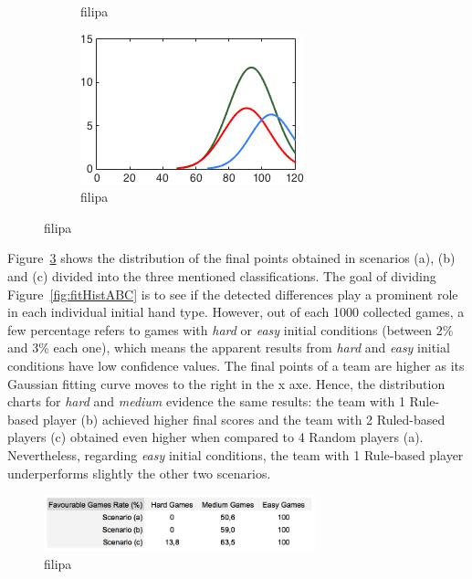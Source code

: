 \begin{figure}[h]
\begin{subfigure}[h]{0.32\textwidth}
                \caption{filipa}
                \label{fig:ABC-Hmedium}
        \end{subfigure}
        \begin{subfigure}[h]{0.32\textwidth}
                \includegraphics[width=\textwidth]{./img/4/ABCeasy}
                \caption{filipa}
                \label{fig:ABC-Heasy}
        \end{subfigure}
        \caption{filipa}
        \label{fig:ABC-CH}
\end{figure}

Figure~\ref{fig:ABC-CH} shows the distribution of the final points obtained in scenarios (a), (b) and (c) divided into the three mentioned classifications.
The goal of dividing Figure~\ref{fig:fitHistABC} is to see if the detected differences play a prominent role in each individual initial hand type.
However, out of each 1000 collected games, a few percentage refers to games with \emph{hard} or \emph{easy} initial conditions (between 2\% and 3\% each one), which means the apparent results from \emph{hard} and \emph{easy} initial conditions have low confidence values.
The final points of a team are higher as its Gaussian fitting curve moves to the right in the x axe.
Hence, the distribution charts for \emph{hard} and \emph{medium} evidence the same results: the team with 1 Rule-based player (b) achieved higher final scores and the team with 2 Ruled-based players (c) obtained even higher when compared to 4 Random players (a).
Nevertheless, regarding \emph{easy} initial conditions, the team with 1 Rule-based player underperforms slightly the other two scenarios.

\begin{figure}[h!]
  \centering
    \includegraphics[width=0.7\textwidth]{./img/4/ABC-fgr}
  \caption{filipa}
\label{fig:ABC-fgr}
\end{figure}

